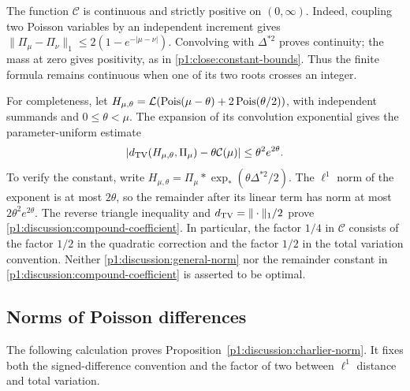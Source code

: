 The function $\mathcal C$ is continuous and strictly positive
on $(0,\infty)$.  Indeed, coupling two Poisson variables by
an independent increment gives
$\|\Pi_\mu-\Pi_\nu\|_1\le2(1-e^{-|\mu-\nu|})$.
Convolving with $\Delta^{*2}$ proves continuity; the mass
at zero gives positivity, as in
\eqref{p1:close:constant-bounds}.  Thus the finite formula
remains continuous when one of its two roots crosses an integer.

For completeness, let
$H_{\mu,\theta}=\mathcal L(\operatorname{Pois}(\mu-\theta)+2\operatorname{Pois}(\theta/2))$,
with independent summands and $0\le\theta<\mu$.
The expansion of its convolution exponential gives the
parameter-uniform estimate
\begin{equation}
 \left|d_{\mathrm{TV}}(H_{\mu,\theta},\Pi_\mu)
                     -\theta\mathcal C(\mu)\right|
       \le\theta^2e^{2\theta}.
 \label{p1:discussion:compound-coefficient}
\end{equation}
To verify the constant, write
$H_{\mu,\theta}
 =\Pi_\mu*\exp_*(\theta\Delta^{*2}/2)$.
The $\ell^1$ norm of the exponent is at most $2\theta$,
so the remainder after its linear term has norm at most
$2\theta^2e^{2\theta}$.
The reverse triangle inequality and
$d_{\mathrm{TV}}=\|\cdot\|_1/2$ prove
\eqref{p1:discussion:compound-coefficient}.
In particular, the factor $1/4$ in $\mathcal C$ consists
of the factor $1/2$ in the quadratic correction and the
factor $1/2$ in the total variation convention.
Neither \eqref{p1:discussion:general-norm} nor the remainder
constant in \eqref{p1:discussion:compound-coefficient} is
asserted to be optimal.


\subsection{Norms of Poisson differences}
\label{p14:comp:poisson-differences}

The following calculation proves Proposition~\ref{p1:discussion:charlier-norm}.
It fixes both the signed-difference convention and the factor of two between
$\ell^1$ distance and total variation.

